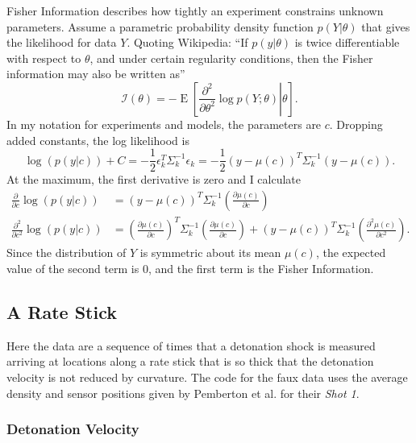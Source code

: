 \documentclass[11pt]{article}
\begin{document}
Fisher Information describes how tightly an experiment constrains
unknown parameters.  Assume a parametric probability density function
$p(Y|\theta)$ that gives the likelihood for data $Y$.  Quoting
Wikipedia: ``If $p(y|\theta)$ is twice differentiable with respect to
$\theta$, and under certain regularity conditions, then the Fisher
information may also be written as''
\begin{equation*}
  \mathcal{I}(\theta) = - \operatorname{E}
  \left[\left. \frac{\partial^2}{\partial\theta^2} \log
      p(Y;\theta)\right|\theta \right].
\end{equation*}
In my notation for experiments and models, the parameters are $c$.
Dropping added constants, the log likelihood is
\begin{equation*}
  \log(p(y|c)) + C = -\frac{1}{2}\epsilon_k^T \Sigma_k^{-1} \epsilon_k
  = -\frac{1}{2}(y-\mu(c))^T \Sigma_k^{-1} (y-\mu(c)).
\end{equation*}
At the maximum, the first derivative is zero and I calculate
\newcommand{\dmudc}{\left(\frac{\partial \mu(c)}{\partial c} \right)}
\begin{align*}
  \frac{\partial}{\partial c} \log(p(y|c)) &= 
      (y-\mu(c))^T \Sigma_k^{-1} \dmudc \\
  \frac{\partial^2}{\partial c^2} \log(p(y|c)) &=
      \dmudc^T \Sigma_k^{-1} \dmudc +  (y-\mu(c))^T \Sigma_k^{-1}
       \left(\frac{\partial^2 \mu(c)}{\partial c^2} \right).
\end{align*}
Since the distribution of $Y$ is symmetric about its mean $\mu(c)$,
the expected value of the second term is 0, and the first term is the
Fisher Information.

\subsection{A Rate Stick}
\label{sec:rate-stick}

Here the data are a sequence of times that a detonation shock is
measured arriving at locations along a rate stick that is so thick
that the detonation velocity is not reduced by curvature.  The code
for the faux data uses the average density and sensor positions given
by Pemberton et al.\cite{Pemberton9501} for their \emph{Shot 1}.

\subsubsection{Detonation Velocity}
\label{sec:det-vel}
\end{document}
